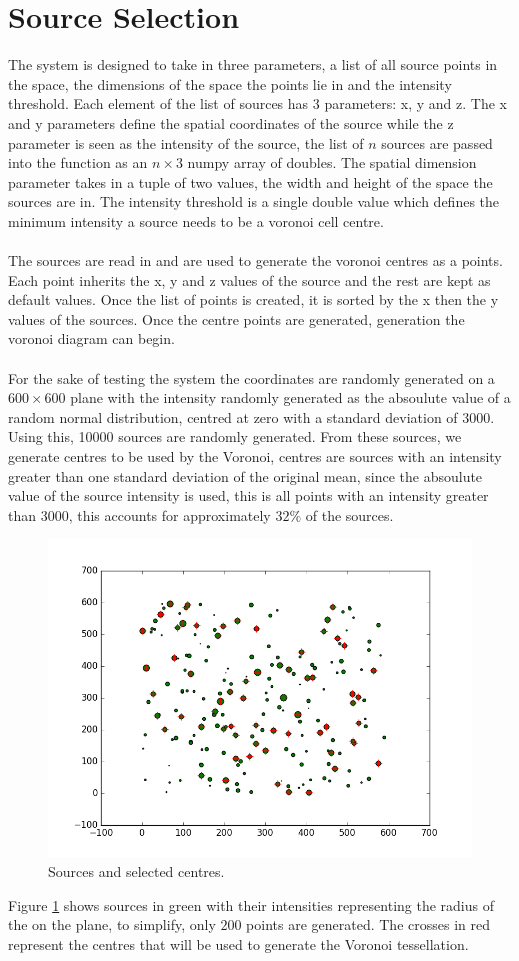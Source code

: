 \section{Source Selection}
The system is designed to take in three parameters, a list of all source points in the space, the dimensions of the space the points lie in and the intensity threshold. Each element of the list of sources has 3 parameters: x, y and z. The x and y parameters define the spatial coordinates of the source while the z parameter is seen as the intensity of the source, the list of $n$ sources are passed into the function as an $n \times 3$ numpy array of doubles. The spatial dimension parameter takes in a tuple of two values, the width and height of the space the sources are in. The intensity threshold is a single double value which defines the minimum intensity a source needs to be a voronoi cell centre.
\\
\\
The sources are read in and are used to generate the voronoi centres as a points. Each point inherits the x, y and z values of the source and the rest are kept as default values. Once the list of points is created, it is sorted by the x then the y values of the sources. Once the centre points are generated, generation the voronoi diagram can begin.
\\
\\
For the sake of testing the system the coordinates are randomly generated on a $600 \times 600$ plane with the intensity randomly generated as the absoulute value of a random normal distribution, centred at zero with a standard deviation of $3000$. Using this, 10000 sources are randomly generated. From these sources, we generate centres to be used by the Voronoi, centres are sources with an intensity greater than one standard deviation of the original mean, since the absoulute value of the source intensity is used, this is all points with an intensity greater than 3000, this accounts for approximately $32\%$ of the sources.
\begin{figure}[H]
\includegraphics[width=\textwidth]{Images/sources.png}
\caption{Sources and selected centres.}
\label{fig:source}
\end{figure}
Figure \ref{fig:source} shows sources in green with their intensities representing the radius of the on the plane, to simplify, only $200$ points are generated. The crosses in red represent the centres that will be used to generate the Voronoi tessellation.